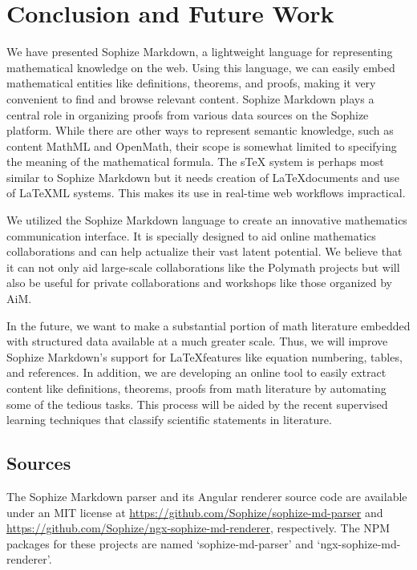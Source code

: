 \documentclass[a4paper]{article}
\begin{document}
\section{Conclusion and Future Work}

We have presented Sophize Markdown, a lightweight language for representing mathematical knowledge on the web. Using this language, we can easily embed mathematical entities like definitions, theorems, and proofs, making it very convenient to find and browse relevant content. Sophize Markdown plays a central role in organizing proofs from various data sources on the Sophize platform. While there are other ways to represent semantic knowledge, such as content MathML and OpenMath, their scope is somewhat limited to specifying the meaning of the mathematical formula. The sTeX system \cite{Kohlhase2008} is perhaps most similar to Sophize Markdown but it needs creation of \LaTeX\space documents and use of \LaTeX ML systems. This makes its use in real-time web workflows impractical.

We utilized the Sophize Markdown language to create an innovative mathematics communication interface. It is specially designed to aid online mathematics collaborations and can help actualize their vast latent potential. We believe that it can not only aid large-scale collaborations like the Polymath projects but will also be useful for private collaborations and workshops like those organized by AiM.

In the future, we want to make a substantial portion of math literature embedded with structured data available at a much greater scale. Thus, we will improve Sophize Markdown's support for \LaTeX\space features like equation numbering, tables, and references. In addition, we are developing an online tool to easily extract content like definitions, theorems, proofs from math literature by automating some of the tedious tasks. This process will be aided by the recent supervised learning techniques \cite{ginev2019scientific} that classify scientific statements in literature.


\subsection*{Sources}
The Sophize Markdown parser and its Angular renderer source code are available under an MIT license at \url{https://github.com/Sophize/sophize-md-parser} and \url{https://github.com/Sophize/ngx-sophize-md-renderer}, respectively. The NPM packages for these projects are named `sophize-md-parser' and `ngx-sophize-md-renderer'.

 


\end{document}
